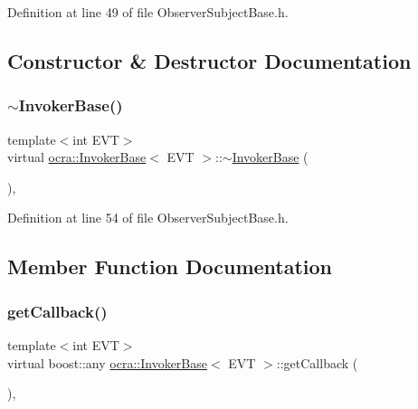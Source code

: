 Definition at line 49 of file Observer\+Subject\+Base.\+h.



\subsection{Constructor \& Destructor Documentation}
\hypertarget{classocra_1_1InvokerBase_aa02504b95fda47269f5c42c4c7650a13}{}\label{classocra_1_1InvokerBase_aa02504b95fda47269f5c42c4c7650a13} 
\subsubsection{\texorpdfstring{$\sim$\+Invoker\+Base()}{~InvokerBase()}}
{\footnotesize\ttfamily template$<$int E\+VT$>$ \\
virtual \hyperlink{classocra_1_1InvokerBase}{ocra\+::\+Invoker\+Base}$<$ E\+VT $>$\+::$\sim$\hyperlink{classocra_1_1InvokerBase}{Invoker\+Base} (\begin{DoxyParamCaption}{ }\end{DoxyParamCaption})\hspace{0.3cm}{\ttfamily [inline]}, {\ttfamily [virtual]}}



Definition at line 54 of file Observer\+Subject\+Base.\+h.



\subsection{Member Function Documentation}
\hypertarget{classocra_1_1InvokerBase_aab9488dbb26120ccfa7c77be11c01ba9}{}\label{classocra_1_1InvokerBase_aab9488dbb26120ccfa7c77be11c01ba9} 
\subsubsection{\texorpdfstring{get\+Callback()}{getCallback()}}
{\footnotesize\ttfamily template$<$int E\+VT$>$ \\
virtual boost\+::any \hyperlink{classocra_1_1InvokerBase}{ocra\+::\+Invoker\+Base}$<$ E\+VT $>$\+::get\+Callback (\begin{DoxyParamCaption}{ }\end{DoxyParamCaption})\hspace{0.3cm}{\ttfamily [protected]}, {}}



